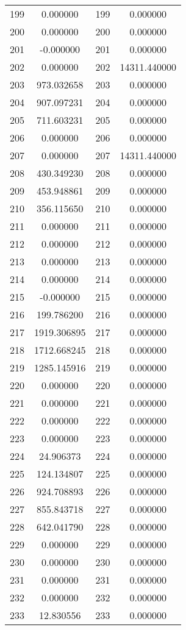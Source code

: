 \documentclass[12pt]{article}
\begin{document}
\begin{longtable}{@{}cccc@{}}
199 & 0.000000 & 199 & 0.000000 \\
200 & 0.000000 & 200 & 0.000000 \\
201 & -0.000000 & 201 & 0.000000 \\
202 & 0.000000 & 202 & 14311.440000 \\
203 & 973.032658 & 203 & 0.000000 \\
204 & 907.097231 & 204 & 0.000000 \\
205 & 711.603231 & 205 & 0.000000 \\
206 & 0.000000 & 206 & 0.000000 \\
207 & 0.000000 & 207 & 14311.440000 \\
208 & 430.349230 & 208 & 0.000000 \\
209 & 453.948861 & 209 & 0.000000 \\
210 & 356.115650 & 210 & 0.000000 \\
211 & 0.000000 & 211 & 0.000000 \\
212 & 0.000000 & 212 & 0.000000 \\
213 & 0.000000 & 213 & 0.000000 \\
214 & 0.000000 & 214 & 0.000000 \\
215 & -0.000000 & 215 & 0.000000 \\
216 & 199.786200 & 216 & 0.000000 \\
217 & 1919.306895 & 217 & 0.000000 \\
218 & 1712.668245 & 218 & 0.000000 \\
219 & 1285.145916 & 219 & 0.000000 \\
220 & 0.000000 & 220 & 0.000000 \\
221 & 0.000000 & 221 & 0.000000 \\
222 & 0.000000 & 222 & 0.000000 \\
223 & 0.000000 & 223 & 0.000000 \\
224 & 24.906373 & 224 & 0.000000 \\
225 & 124.134807 & 225 & 0.000000 \\
226 & 924.708893 & 226 & 0.000000 \\
227 & 855.843718 & 227 & 0.000000 \\
228 & 642.041790 & 228 & 0.000000 \\
229 & 0.000000 & 229 & 0.000000 \\
230 & 0.000000 & 230 & 0.000000 \\
231 & 0.000000 & 231 & 0.000000 \\
232 & 0.000000 & 232 & 0.000000 \\
233 & 12.830556 & 233 & 0.000000 \\

\end{longtable}
\end{document}
